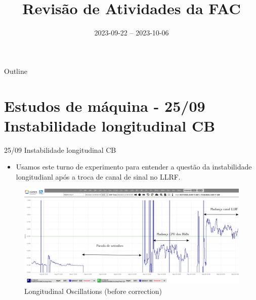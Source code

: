 \documentclass{beamer}					%
\title{Revisão de Atividades da FAC}	%
\institute{LNLS.DAC.FAC}					%
\date{2023-09-22 -- 2023-10-06}									%
\begin{document}
\begin{frame}
  \titlepage
  \href{https://github.com/lnls-fac/doc-review-dac-fac}{}
  \href{https://www.overleaf.com/read/sbdjxtzfchrm}{}
  
  
\end{frame}

\begin{frame}{Outline}
  \tableofcontents
\end{frame}

%


\section{Estudos de máquina - 25/09 Instabilidade longitudinal CB}


\begin{frame}{25/09 Instabilidade longitudinal CB}

    \begin{itemize}
		\item Usamos este turno de experimento para entender a questão da instabilidade longitudianl após a troca de canal de sinal no LLRF.
	\end{itemize}

    \begin{figure}[H]
		\centering
        \includegraphics[width=.9\textwidth]{figures/long-osc-before-correction.png}
        \caption{Longitudinal Oscillations (before correction)}
        \label{fig:figure1}
    \end{figure}
    
\end{frame}
\end{document}
